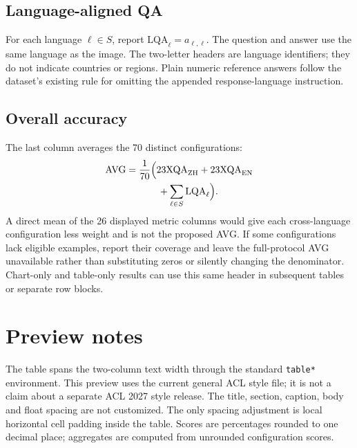 \documentclass[11pt]{article}
\begin{document}
\subsection{Language-aligned QA}
For each language $\ell\in S$, report $\mathrm{LQA}_{\ell}=a_{\ell,\ell}$.
The question and answer use the same language as the image. The two-letter
headers are language identifiers; they do not indicate countries or regions.
Plain numeric reference answers follow the dataset's existing rule for
omitting the appended response-language instruction.

\subsection{Overall accuracy}
The last column averages the 70 distinct configurations:
\begin{equation*}
\begin{aligned}
\mathrm{AVG}={}&\frac{1}{70}\Bigl(23\mathrm{XQA}_{\mathrm{ZH}}+23\mathrm{XQA}_{\mathrm{EN}}\\
&\qquad+\sum_{\ell\in S}\mathrm{LQA}_{\ell}\Bigr).
\end{aligned}
\end{equation*}
A direct mean of the 26 displayed metric columns would give each
cross-language configuration less weight and is not the proposed AVG.
If some configurations lack eligible examples, report their coverage and
leave the full-protocol AVG unavailable rather than substituting zeros or
silently changing the denominator. Chart-only and table-only results can
use this same header in subsequent tables or separate row blocks.

\section{Preview notes}
The table spans the two-column text width through the standard
\texttt{table*} environment. This preview uses the current general ACL style
file; it is not a claim about a separate ACL 2027 style release.
The title, section, caption, body and float spacing are not customized.
The only spacing adjustment is local horizontal cell padding inside the
table. Scores are percentages rounded to one decimal place; aggregates are
computed from unrounded configuration scores.
\end{document}
